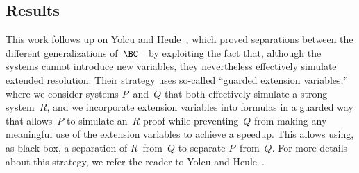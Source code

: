 \documentclass[12pt]{article}
\begin{document}
\subsection{Results}
\label{sec:results}

This work follows up on Yolcu and Heule~\cite{YH23},
which proved separations between the different generalizations of~$\BC^-$
by exploiting the fact that, although the systems cannot introduce new variables,
they nevertheless effectively simulate~\cite{PS10} extended resolution.
Their strategy uses so-called ``guarded extension variables,''
where we consider systems $P$~and~$Q$
that both effectively simulate a strong system~$R$,
and we incorporate extension variables into formulas
in a guarded way that allows~$P$ to simulate an~$R$-proof
while preventing~$Q$ from making any meaningful use
of the extension variables to achieve a speedup.
This allows using, as black-box,
a separation of $R$~from~$Q$ to separate $P$~from~$Q$.
For more details about this strategy,
we refer the reader to Yolcu and Heule~\cite[Section~1.3]{YH23}.
\end{document}
